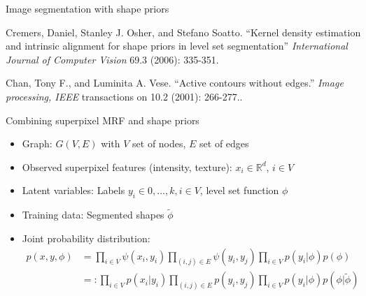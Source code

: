 \documentclass[mathserif,final,hyperref={pdfpagelabels=false}]{beamer} %
\def\RN{ \mathbb{R} }											%
\def\Nu{ V }
\begin{document}
\begin{frame}
\begin{columns}
\begin{column1lti}
\begin{blocklti}{Image segmentation with shape priors}
\begin{thebibliography}{1}
\begin{spacing}{2.0}
{ \footnotesize Cremers, Daniel, Stanley J. Osher, and Stefano Soatto. ``{Kernel density estimation and intrinsic alignment for shape priors in level set segmentation}'' \emph{ International Journal of Computer Vision} 69.3 (2006): 335-351.} 


 \vspace{1ex}

{ \footnotesize Chan, Tony F., and Luminita A. Vese. ``{Active contours without edges.}'' \emph{ Image processing, IEEE} transactions on 10.2 (2001): 266-277..}
\end{spacing}
\end{thebibliography}


\end{blocklti}

\vfill


\begin{blocklti}{Combining superpixel MRF and shape priors}

\begin{itemize}
\item Graph: $G(V, E)$ with $V$ set of nodes, $E$ set of edges
\item Observed superpixel features (intensity, texture): $x_i \in \RN^d$, $i\in V$
\item Latent variables: Labels $y_i \in {0,\dots,k}, i\in V$, level set function $\phi$
\item Training data: Segmented shapes $\tilde{\phi}$
\item Joint probability distribution:
\begin{align*}
p(x,y,\phi) &=  \prod_{i\in \Nu} \psi(x_i,y_i)  \prod_{(i,j)\in E} \psi(y_i,y_j)\prod_{i\in \Nu} p(y_i|\phi)p(\phi) \label{total_joint}\\
&=: \prod_{i\in \Nu} p(x_i|y_i)\prod_{(i,j)\in E} p(y_i,y_j) \prod_{i\in \Nu} p(y_i|\phi)p(\phi|\tilde{\phi})\nonumber
\end{align*}
\end{itemize}


\end{blocklti}
\end{column1lti}
\end{columns}
\end{frame}
\end{document}
